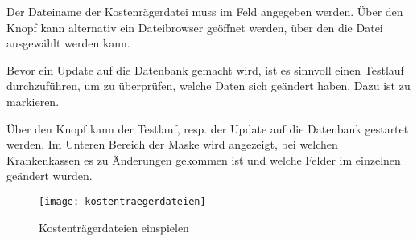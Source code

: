 Der Dateiname der Kostenrägerdatei muss im Feld 
 angegeben werden. Über den 
Knopf  kann alternativ ein Dateibrowser geöffnet werden,
über den die Datei ausgewählt werden kann.

Bevor ein Update auf die Datenbank gemacht wird, ist es sinnvoll einen
Testlauf durchzuführen, um zu überprüfen, welche Daten sich geändert haben.
Dazu ist  zu markieren.

Über den Knopf  kann der Testlauf, resp.
der Update auf die Datenbank gestartet werden. Im Unteren Bereich der Maske
wird angezeigt, bei welchen Krankenkassen es zu Änderungen gekommen ist und
welche Felder im einzelnen geändert wurden.

\begin{figure}[H]
\centering
\texttt{[image: kostentraegerdateien]}
\caption{Kostenträgerdateien einspielen\label{kostentraegerdateien:fig}}
\end{figure}


